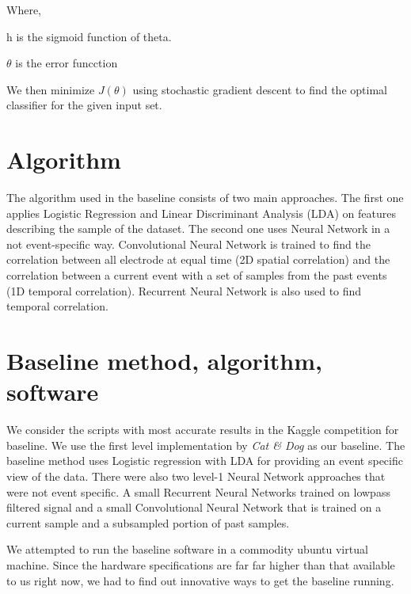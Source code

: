 \documentclass[final,leqno,onefignum,onetabnum]{siamltexmm}
\begin{document}
Where,

h is the sigmoid function of theta.

\(\theta\) is the error funcction

We then minimize \(J(\theta)\) using stochastic gradient descent to find the optimal classifier for the given input set.

\section{Algorithm}
The algorithm used in the baseline consists of two main approaches. The first one applies Logistic Regression and Linear Discriminant Analysis (LDA) on features describing the sample of the dataset. The second one uses Neural Network in a not event-specific way. Convolutional Neural Network is trained to find the correlation between all electrode at equal time (2D spatial correlation) and the correlation between a current event with a set of samples from the past events (1D temporal correlation). Recurrent Neural Network is also used to find temporal correlation.


\section{Baseline method, algorithm, software}
We consider the scripts with most accurate results in the Kaggle competition for baseline\cite{kaggleleaderboard}.  We use the first level implementation by \textit{Cat \& Dog}\cite{kagglewinners} as our baseline.
The baseline method uses Logistic regression with LDA for providing an event specific view of the data.  There were also two level-1 Neural Network approaches that were not event specific.
A small Recurrent Neural Networks trained on lowpass filtered signal and a small Convolutional Neural Network that is trained on a current sample and a subsampled portion of past samples.

We attempted to run the baseline software\cite{baselineSoftware} in a commodity ubuntu virtual machine.  Since the hardware specifications\cite{hardwarespecifications} are far far higher than that available to us right now, we had to find out innovative ways to get the baseline running.
\end{document}
